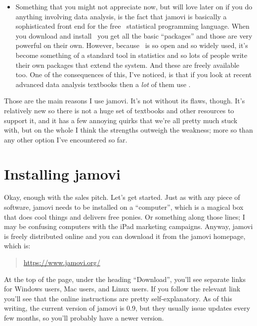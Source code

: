 \begin{itemize}
\item Something that you might not appreciate now, but will love later on if you do anything involving data analysis, is the fact that jamovi is basically a sophisticated front end for the free \R\ statistical programming language. When you download and install \R\ you get all the basic ``packages'' and those are very powerful on their own. However, because \R\ is so open and so widely used, it's become something of a standard tool in statistics and so lots of people write their own packages that extend the system. And these are freely available too. One of the consequences of this, I've noticed, is that if you look at recent advanced data analysis textbooks then a {\it lot} of them use \R. 
\end{itemize}
Those are the main reasons I use jamovi. It's not without its flaws, though. It's relatively new so there is not a huge set of textbooks and other resources to support it, and it has a few annoying quirks that we're all pretty much stuck with, but on the whole I think the strengths outweigh the weakness; more so than any other option I've encountered so far. 


\section{Installing jamovi \label{sec:gettingjamovi}}

Okay, enough with the sales pitch. Let's get started. Just as with any piece of software,  jamovi needs to be installed on a ``computer'', which is a magical box that does cool things and delivers free ponies. Or something along those lines; I may be confusing computers with the iPad marketing campaigns. Anyway, jamovi is freely distributed online and you can download it from the jamovi homepage, which is:
\begin{quote}
\url{https://www.jamovi.org/}
\end{quote}
At the top of the page, under the heading ``Download'', you'll see separate links for Windows users, Mac users, and Linux users. If you follow the relevant link you'll see that the online instructions are pretty self-explanatory. As of this writing, the current version of  jamovi is 0.9, but they usually issue updates every few months, so you'll probably have a newer version.


